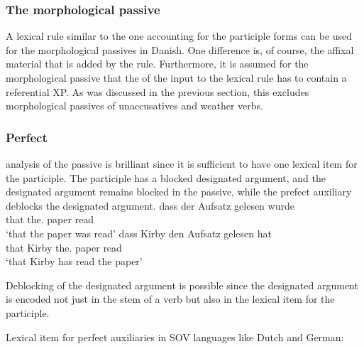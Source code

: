 \subsubsection{The morphological passive}


A lexical rule similar to the one accounting for the participle forms can be used for the
morphological passives in Danish. One difference is, of course, the affixal material that is added by
the rule. Furthermore, it is assumed for the morphological passive that the \da of the input to the lexical rule has to contain
a referential XP. As was discussed in the previous section, this excludes morphological passives of
unaccusatives and weather verbs. 





\subsubsection{Perfect}

 analysis of the passive is brilliant since it is sufficient to have one lexical
item for the participle. The participle has a blocked designated argument, and the designated
argument remains blocked in the passive, while the prefect auxiliary deblocks the designated 
argument. 
\eal
\ex
\gll dass der        Aufsatz gelesen wurde\\
     that the.\NOM{} paper   read    \AUX\\
\glt `that the paper was read'
\ex
\gll dass Kirby den Aufsatz gelesen hat\\
     that Kirby the.\ACC{} paper read \AUX\\
\glt `that Kirby has read the paper'
\zl

Deblocking of the designated argument is possible since the designated argument is encoded not just in the stem of a verb
but also in the lexical item for the participle.   

\ea
Lexical item for perfect auxiliaries in SOV languages like Dutch and German:\\
\z



